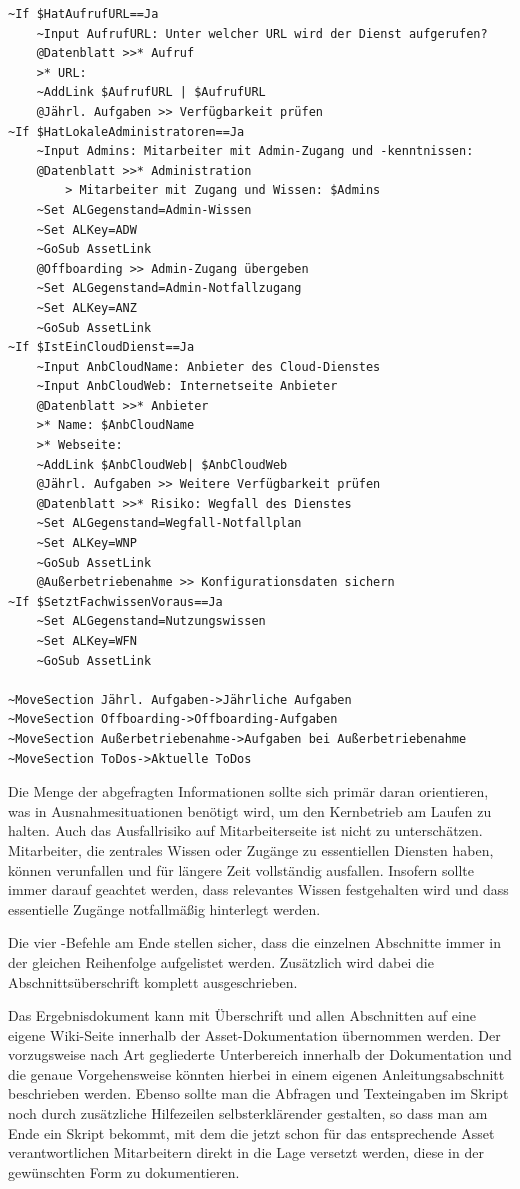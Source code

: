 \label{BspAsset4}
\begin{verbatim}
~If $HatAufrufURL==Ja
    ~Input AufrufURL: Unter welcher URL wird der Dienst aufgerufen?
    @Datenblatt >>* Aufruf
    >* URL:
    ~AddLink $AufrufURL | $AufrufURL
    @Jährl. Aufgaben >> Verfügbarkeit prüfen
~If $HatLokaleAdministratoren==Ja
    ~Input Admins: Mitarbeiter mit Admin-Zugang und -kenntnissen:
    @Datenblatt >>* Administration
        > Mitarbeiter mit Zugang und Wissen: $Admins
    ~Set ALGegenstand=Admin-Wissen
    ~Set ALKey=ADW
    ~GoSub AssetLink
    @Offboarding >> Admin-Zugang übergeben
    ~Set ALGegenstand=Admin-Notfallzugang
    ~Set ALKey=ANZ
    ~GoSub AssetLink
~If $IstEinCloudDienst==Ja
    ~Input AnbCloudName: Anbieter des Cloud-Dienstes
    ~Input AnbCloudWeb: Internetseite Anbieter
    @Datenblatt >>* Anbieter
    >* Name: $AnbCloudName
    >* Webseite:
    ~AddLink $AnbCloudWeb| $AnbCloudWeb
    @Jährl. Aufgaben >> Weitere Verfügbarkeit prüfen
    @Datenblatt >>* Risiko: Wegfall des Dienstes
    ~Set ALGegenstand=Wegfall-Notfallplan
    ~Set ALKey=WNP
    ~GoSub AssetLink
    @Außerbetriebenahme >> Konfigurationsdaten sichern
~If $SetztFachwissenVoraus==Ja
    ~Set ALGegenstand=Nutzungswissen
    ~Set ALKey=WFN
    ~GoSub AssetLink

~MoveSection Jährl. Aufgaben->Jährliche Aufgaben
~MoveSection Offboarding->Offboarding-Aufgaben
~MoveSection Außerbetriebenahme->Aufgaben bei Außerbetriebenahme
~MoveSection ToDos->Aktuelle ToDos
\end{verbatim}

Die Menge der abgefragten Informationen sollte sich primär daran orientieren, was in Ausnahmesituationen benötigt wird, um den Kernbetrieb am Laufen zu halten. Auch das Ausfallrisiko auf Mitarbeiterseite ist nicht zu unterschätzen. Mitarbeiter, die zentrales Wissen oder Zugänge zu essentiellen Diensten haben, können verunfallen und für längere Zeit vollständig ausfallen. Insofern sollte immer darauf geachtet werden, dass relevantes Wissen festgehalten wird und dass essentielle Zugänge notfallmäßig hinterlegt werden.

Die vier -Befehle am Ende stellen sicher, dass die einzelnen Abschnitte immer in der gleichen Reihenfolge aufgelistet werden. Zusätzlich wird dabei die Abschnittsüberschrift komplett ausgeschrieben.

Das Ergebnisdokument kann mit Überschrift und allen Abschnitten auf eine eigene Wiki-Seite innerhalb der Asset-Dokumentation übernommen werden. Der vorzugsweise nach Art gegliederte Unterbereich innerhalb der Dokumentation und die genaue Vorgehensweise könnten hierbei in einem eigenen Anleitungsabschnitt beschrieben werden. Ebenso sollte man die Abfragen und Texteingaben im Skript noch durch zusätzliche Hilfezeilen selbsterklärender gestalten, so dass man am Ende ein Skript bekommt, mit dem die jetzt schon für das entsprechende Asset verantwortlichen Mitarbeitern direkt in die Lage versetzt werden, diese in der gewünschten Form zu dokumentieren.

